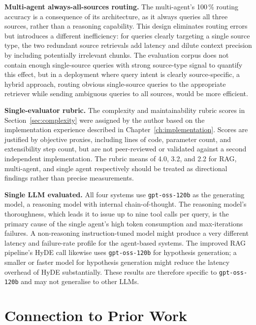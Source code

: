 \textbf{Multi-agent always-all-sources routing.} The multi-agent's 100\,\% routing accuracy is a consequence of its architecture, as it always queries all three sources, rather than a reasoning capability. This design eliminates routing errors but introduces a different inefficiency: for queries clearly targeting a single source type, the two redundant source retrievals add latency and dilute context precision by including potentially irrelevant chunks. The evaluation corpus does not contain enough single-source queries with strong source-type signal to quantify this effect, but in a deployment where query intent is clearly source-specific, a hybrid approach, routing obvious single-source queries to the appropriate retriever while sending ambiguous queries to all sources, would be more efficient.

\textbf{Single-evaluator rubric.} The complexity and maintainability rubric scores in Section~\ref{sec:complexity} were assigned by the author based on the implementation experience described in Chapter~\ref{ch:implementation}. Scores are justified by objective proxies, including lines of code, parameter count, and extensibility step count, but are not peer-reviewed or validated against a second independent implementation. The rubric means of 4.0, 3.2, and 2.2 for RAG, multi-agent, and single agent respectively should be treated as directional findings rather than precise measurements.

\textbf{Single LLM evaluated.} All four systems use \texttt{gpt-oss-120b} as the generating model, a reasoning model with internal chain-of-thought. The reasoning model's thoroughness, which leads it to issue up to nine tool calls per query, is the primary cause of the single agent's high token consumption and max-iterations failures. A non-reasoning instruction-tuned model might produce a very different latency and failure-rate profile for the agent-based systems. The improved RAG pipeline's HyDE call likewise uses \texttt{gpt-oss-120b} for hypothesis generation; a smaller or faster model for hypothesis generation might reduce the latency overhead of HyDE substantially. These results are therefore specific to \texttt{gpt-oss-120b} and may not generalise to other LLMs.


\section{Connection to Prior Work}
\label{sec:priorwork}

